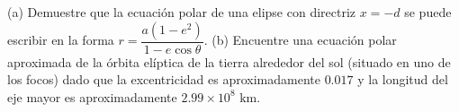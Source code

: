 \item (a) Demuestre que la ecuación polar de una elipse con directriz $x = -d$ se puede escribir en la forma $r = \dfrac{a(1 - e^2)}{1 - e \cos\theta}$.
    (b) Encuentre una ecuación polar aproximada de la órbita elíptica de la tierra alrededor del sol (situado en uno de los focos) dado que la excentricidad es aproximadamente $0.017$ y la longitud del eje mayor es aproximadamente $2.99 \times 10^8 \text{ km}$.
